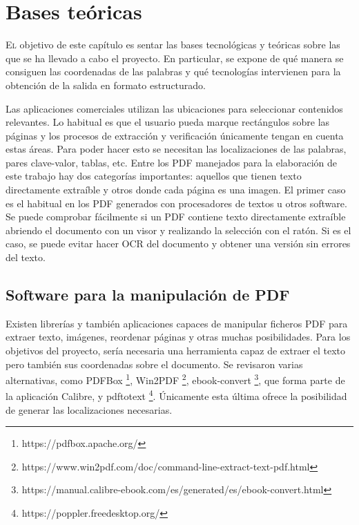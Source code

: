 
\chapter{Bases teóricas}
\label{chap:bases-teoricas}

\lettrine{E}{l} objetivo de este capítulo es sentar las bases tecnológicas y teóricas sobre las que se ha llevado a cabo el proyecto. En particular, se expone de qué manera se consiguen las coordenadas de las palabras y qué tecnologías intervienen para la obtención de la salida en formato estructurado.

Las aplicaciones comerciales utilizan las ubicaciones para seleccionar contenidos relevantes. Lo habitual es que el usuario pueda marque rectángulos sobre las páginas y los procesos de extracción y verificación únicamente tengan en cuenta estas áreas. Para poder hacer esto se necesitan las localizaciones de las palabras, pares clave-valor, tablas, etc. Entre los PDF manejados para la elaboración de este trabajo hay dos categorías importantes: aquellos que tienen texto directamente extraíble y otros donde cada página es una imagen. El primer caso es el habitual en los PDF generados con procesadores de textos u otros software. Se puede comprobar fácilmente si un PDF contiene texto directamente extraíble abriendo el documento con un visor y realizando la selección con el ratón. Si es el caso, se puede evitar hacer OCR del documento y obtener una versión sin errores del texto.

\section{Software para la manipulación de PDF}

Existen librerías y también aplicaciones capaces de manipular ficheros PDF para extraer texto, imágenes, reordenar páginas y otras muchas posibilidades. Para los objetivos del proyecto, sería necesaria una herramienta capaz de extraer el texto pero también sus coordenadas sobre el documento. Se revisaron varias alternativas, como PDFBox 
\footnote{https://pdfbox.apache.org/}, Win2PDF 
\footnote{https://www.win2pdf.com/doc/command-line-extract-text-pdf.html}, ebook-convert 
\footnote{https://manual.calibre-ebook.com/es/generated/es/ebook-convert.html}, que forma parte de la aplicación Calibre, y pdftotext 
\footnote{https://poppler.freedesktop.org/}. Únicamente esta última ofrece la posibilidad de generar las localizaciones necesarias.

